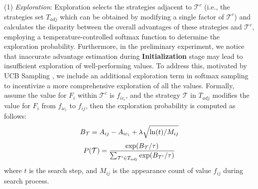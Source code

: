 \noindent (1) \textit{Exploration}: Exploration selects the strategies adjacent to $\mathcal{T}^{c}$ (i.e., the strategies set $T_{adj}$ which can be obtained by modifying a single factor of $\mathcal{T}^{c}$) and
calculates the disparity between the overall advantages of these strategies and $\mathcal{T}^{c}$, employing a temperature-controlled softmax function to determine the exploration probability.
Furthermore, in the preliminary experiment, we notice that inaccurate advantage estimation during \textbf{Initialization} stage may lead to insufficient exploration of well-performing values.
To address this, motivated by UCB Sampling \cite{lai1985asymptotically}, we include an additional exploration term in softmax sampling to incentivize a more comprehensive exploration of all the values. 
Formally, assume the value for $F_i$ within $\mathcal{T}^{c}$ is $f_{ic_i}$, and the strategy $\mathcal{T}$ in $T_{adj}$ modifies the value for $F_i$ from $f_{ic_i}$ to $f_{ij}$, then the exploration probability is computed as follows:
\begin{equation}
\small
B_{\mathcal{T}} = A_{ij} - A_{ic_{i}} + \lambda\sqrt{\ln(t) / {M_{ij}}}
\end{equation}
\begin{equation}
\small
\label{sample}
P(\mathcal{T}) = \frac{\exp(B_{\mathcal{T}} / \tau)}{\sum_{\mathcal{T}' \in T_{adj}} \exp(B_{\mathcal{T}'} / \tau)}
\end{equation}
where $t$ is the search step, and $M_{ij}$ is the appearance count of value $f_{ij}$ during search process.


